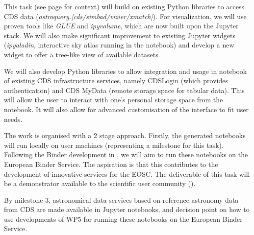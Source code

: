\begin{task}[
  title=Demonstrator: Astronomy,
  id=astro,
  lead=CDS,
  PM=18,
  wphases={18-42},
  partners={EGI,INSERM,QS,SRL,WTT,XFEL}
]

  This task (see page \pageref{sec:concept-demonstrator-astronomy} for
  context) will build on existing Python libraries to access CDS data
  (\textit{astroquery.[cds/simbad/vizier/xmatch]}). For visualization, we will
  use proven tools like \textit{GLUE} and \textit{ipyvolume}, which are now
  built upon the Jupyter stack.
  We will also make significant improvement to existing Jupyter widgets
  (\textit{ipyaladin}, interactive sky atlas running in the notebook) and
  develop a new widget to offer a tree-like view of available
  datasets.

  We will also develop Python libraries to allow integration and usage in
  notebook of existing CDS infrastructure services, namely CDSLogin (which
  provides authentication) and CDS MyData (remote storage space for tabular
  data).
  This will allow the user to interact with one's personal storage space from
  the notebook. It will also allow for advanced customisation of the interface
  to fit user needs.

  The work is organised with a 2 stage approach. Firstly, the generated
  notebooks will run locally on user machines (representing a milestone for
  this task). Following the Binder development in , we will aim
  to run these notebooks on the European Binder Service. The aspiration is
  that this contributes to the development of innovative services for the EOSC.
  The deliverable of this task will be a demonstrator available to the
  scientific user community ().

  By milestone 3, astronomical data services based on reference
  astronomy data from CDS are made available in Jupyter notebooks, and
  decision point on how to use developments of WP5 for running these
  notebooks on the European Binder Service.
\end{task}
